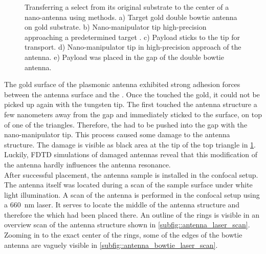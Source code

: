 \begin{figure}[htp]
\begin{subfigure}[t]{ 0.49\linewidth}
					\caption{}
					\label{subfig::pp_payload_delivered}
				\end{subfigure}
				\caption[Pick-and-place coupling of \nd to antenna]{Transferring a select \nd from its original substrate to the center of a nano-antenna using \pp methods. a) Target gold double bowtie antenna on gold substrate. b) Nano-manipulator tip high-precision approaching a predetermined target \nd. c) Payload \nd sticks to the tip for transport. d) Nano-manipulator tip in high-precision approach of the antenna. e) Payload \nd was placed in the gap of the double bowtie antenna.}
				\label{fig::pp_antenna}
			\end{figure}

			The gold surface of the plasmonic antenna exhibited strong adhesion forces between the antenna surface and the \nd.
			Once the \nd touched the gold, it could not be picked up again with the tungsten tip.
			The \nd first touched the antenna structure a few nanometers away from the gap and immediately sticked to the surface, on top of one of the triangles.
			Therefore, the \nd had to be pushed into the gap with the nano-manipulator tip.
			This process caused some damage to the antenna structure.
			The damage is visible as black area at the tip of the top triangle in \cref{subfig::pp_payload_delivered}.
			Luckily, FDTD simulations of damaged antennas reveal that this modification of the antenna hardly influences the antenna resonance.
			\\
			After successful placement, the antenna sample is installed in the confocal setup.
			The antenna itself was located during a scan of the sample surface under white light illumination.
			A scan of the antenna is performed in the confocal setup using a \SI{660}{nm} \cw laser.
			It serves to locate the middle of the antenna structure and therefore the \nd which had been placed there.
			An outline of the rings is visible in an overview scan of the antenna structure shown in \cref{subfig::antenna_laser_scan}.
			Zooming in to the exact center of the rings, some of the edges of the bowtie antenna are vaguely visible in \cref{subfig::antenna_bowtie_laser_scan}.

